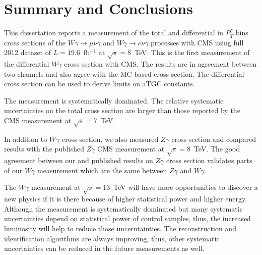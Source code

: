 \section{Summary and Conclusions}
\label{sec:Conclusions}

This dissertation reports a measurement of the total and differential in $P_T^{\gamma}$ bins cross sections of the $W\gamma\rightarrow\mu\nu\gamma$ and $W\gamma\rightarrow e\nu\gamma$ processes with CMS using full 2012 dataset of $L=19.6$~fb$^{-1}$ at $\sqrt{s}=8$~TeV. This is the first measurement of the differential $W\gamma$ cross section with CMS. The results are in agreement between two channels and also agree with the MC-based cross section. The differential cross section can be used to derive limits on aTGC constants.

The measurement is systematically dominated. The relative systematic uncertainties on the total cross section are larger than those reported by the CMS measurement at $\sqrt{s}=7$~TeV. 

In addition to $W\gamma$ cross section, we also measured $Z\gamma$ cross section and compared results with the published $Z\gamma$ CMS measurement at $\sqrt{s}=8$~TeV. The good agreement between our and published results on $Z\gamma$ cross section validates parts of our $W\gamma$ measurement which are the same between $Z\gamma$ and $W\gamma$.

The $W\gamma$ measurement at $\sqrt{s}=13$~TeV will have more opportunities to discover a new physics if it is there because of higher statistical power and higher energy. Although the measurement is systematically dominated but many systematic uncertainties depend on statistical power of control samples, thus, the increased luminosity will help to reduce those uncerntainties. The reconstruction and identification algorithms are always improving, thus, other systematic uncertainties can be reduced in the future measurements as well.

